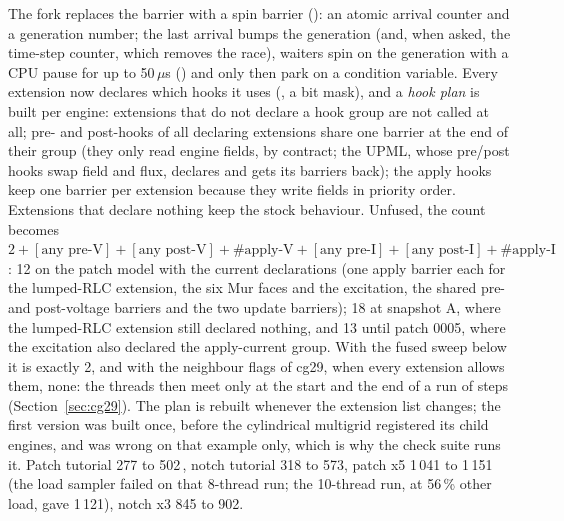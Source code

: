 The fork replaces the barrier with a spin barrier (): an atomic arrival counter and a
generation number; the last arrival bumps the generation (and, when asked, the time-step counter, which removes the
race), waiters spin on the generation with a CPU pause for up to 50\,$\mu$s ()
and only then park on a condition variable. Every extension now declares which hooks it uses
(, a bit mask), and a \emph{hook plan} is built per engine: extensions that do not declare a hook
group are not called at all; pre- and post-hooks of all declaring extensions share one barrier at the end of their
group (they only read engine fields, by contract; the UPML, whose pre/post hooks swap field and flux, declares
 and gets its barriers back); the apply hooks keep one barrier per extension because
they write fields in priority order. Extensions that declare nothing keep the stock behaviour. Unfused, the count
becomes $2 + [\text{any pre-V}] + [\text{any post-V}] + \#\text{apply-V} + [\text{any pre-I}] + [\text{any post-I}] +
\#\text{apply-I}$: 12 on the patch model with the current declarations (one apply barrier each for the lumped-RLC
extension, the six Mur faces and the excitation, the shared pre- and post-voltage barriers and the two update
barriers); 18 at snapshot A, where the lumped-RLC extension still declared nothing, and 13 until patch 0005, where the
excitation also declared the apply-current group. With the fused sweep below it is exactly 2, and with the neighbour
flags of cg29, when every extension allows them, none: the threads then meet only at the start and the end of a run of
steps (Section~\ref{sec:cg29}). The plan is rebuilt
whenever the extension list changes; the first version was built once, before the cylindrical multigrid registered
its child engines, and was wrong on that example only, which is why the check suite runs it.
Patch tutorial 277 to 502\,\MC, notch tutorial 318 to 573, patch x5 1\,041 to 1\,151 (the load sampler failed on that
8-thread run; the 10-thread run, at 56\,\% other load, gave 1\,121), notch x3 845 to 902.

